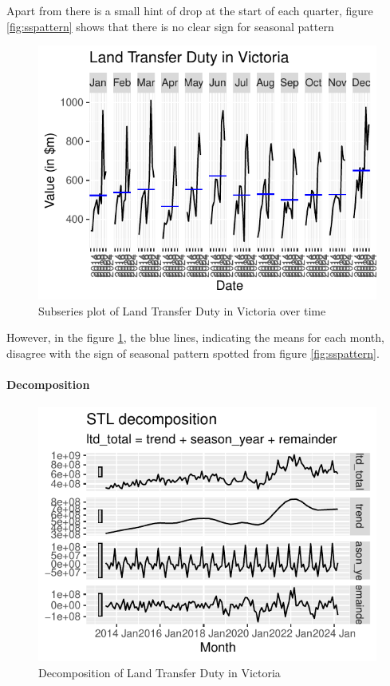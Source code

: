 \documentclass[11pt,a4paper,]{article}
\begin{document}
Apart from there is a small hint of drop at the start of each quarter, figure \ref{fig:sspattern} shows that there is no clear sign for seasonal pattern

\begin{figure}[H]

{\centering \includegraphics{Final_Report_files/figure-latex/subseries-1} 

}

\caption{Subseries plot of Land Transfer Duty in Victoria over time}\label{fig:subseries}
\end{figure}

However, in the figure \ref{fig:subseries}, the blue lines, indicating the means for each month, disagree with the sign of seasonal pattern spotted from figure \ref{fig:sspattern}.

\paragraph{Decomposition}\label{decomposition}

\begin{figure}[H]

{\centering \includegraphics{Final_Report_files/figure-latex/dcmp-1} 

}

\caption{Decomposition of Land Transfer Duty in Victoria}\label{fig:dcmp}
\end{figure}
\end{document}
